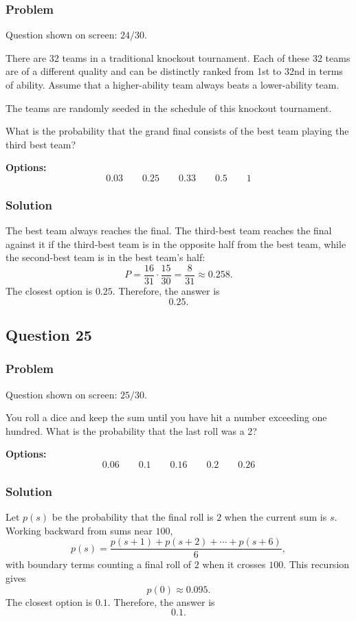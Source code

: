 \documentclass[12pt]{article}
\begin{document}
\subsubsection{Problem}
Question shown on screen: \(24/30\).

There are 32 teams in a traditional knockout tournament. Each of these 32 teams are of a different quality and can be distinctly ranked from 1st to 32nd in terms of ability. Assume that a higher-ability team always beats a lower-ability team.

The teams are randomly seeded in the schedule of this knockout tournament.

What is the probability that the grand final consists of the best team playing the third best team?

\noindent\textbf{Options:}
\[
\boxed{0.03}
\qquad
\boxed{0.25}
\qquad
\boxed{0.33}
\qquad
\boxed{0.5}
\qquad
\boxed{1}
\]

\subsubsection{Solution}
The best team always reaches the final. The third-best team reaches the final against it if the third-best team is in the opposite half from the best team, while the second-best team is in the best team's half:
\[
P=\frac{16}{31}\cdot \frac{15}{30}
=\frac{8}{31}\approx 0.258.
\]
The closest option is \(0.25\). Therefore, the answer is
\[
\boxed{0.25}.
\]

\subsection{Question 25}
\subsubsection{Problem}
Question shown on screen: \(25/30\).

You roll a dice and keep the sum until you have hit a number exceeding one hundred. What is the probability that the last roll was a 2?

\noindent\textbf{Options:}
\[
\boxed{0.06}
\qquad
\boxed{0.1}
\qquad
\boxed{0.16}
\qquad
\boxed{0.2}
\qquad
\boxed{0.26}
\]

\subsubsection{Solution}
Let \(p(s)\) be the probability that the final roll is \(2\) when the current sum is \(s\). Working backward from sums near \(100\),
\[
p(s)=\frac{p(s+1)+p(s+2)+\cdots+p(s+6)}{6},
\]
with boundary terms counting a final roll of \(2\) when it crosses \(100\). This recursion gives
\[
p(0)\approx 0.095.
\]
The closest option is \(0.1\). Therefore, the answer is
\[
\boxed{0.1}.
\]
\end{document}
